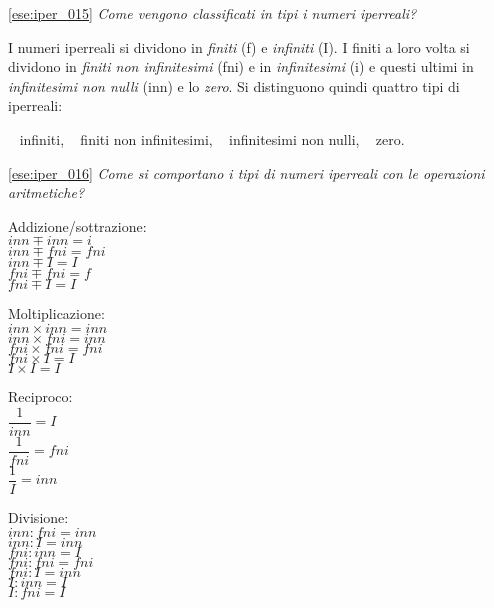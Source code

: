 \ref{ese:iper_015} 
\emph{Come vengono classificati in tipi i numeri iperreali?}

I numeri iperreali si dividono in \emph{finiti} (f) e \emph{infiniti} (I). 
I finiti a loro volta si dividono in \emph{finiti non infinitesimi} (fni) e 
in 
\emph{infinitesimi} (i) e 
questi ultimi in \emph{infinitesimi non nulli} (inn) e lo \emph{zero}. 
Si distinguono quindi quattro tipi di iperreali: 
\begin{center}
\textbullet ~ infiniti, \qquad 
\textbullet ~ finiti non infinitesimi, \qquad 
\textbullet ~ infinitesimi non nulli, \qquad 
\textbullet ~ zero.
\end{center}

\ref{ese:iper_016} 
\emph{Come si comportano i tipi di numeri iperreali con le operazioni 
aritmetiche?}

\noindent\begin{minipage}{.30\textwidth}
 Addizione/sottrazione:\\
\(inn \mp inn = i\)\\
\(inn \mp fni = fni\)\\
\(inn \mp I = I\)\\
\(fni \mp fni = f\)\\
\(fni \mp I = I\)
\vspace{24pt}
\end{minipage}
\noindent\begin{minipage}{.25\textwidth}
 Moltiplicazione:\\
\(inn \times inn = inn\)\\
\(inn \times fni = inn\)\\
\(fni \times fni = fni\)\\
\(fni \times I = I\)\\
\(I \times I = I\)
\vspace{24pt}
\end{minipage}
\noindent\begin{minipage}{.15\textwidth}
 Reciproco:\\
\(\dfrac{1}{inn} = I\)\\
\(\dfrac{1}{fni} = fni\)\\
\(\dfrac{1}{I} = inn\)\\
\vspace{12pt}
\end{minipage}
\noindent\begin{minipage}{.25\textwidth}
 Divisione:\\
\(inn : fni = inn\)\\
\(inn : I = inn\)\\
\(fni : inn = I\)\\
\(fni : fni = fni\)\\
\(fni : I = inn\)\\
\(I : inn = I\)\\
\(I : fni = I\)
\end{minipage}

